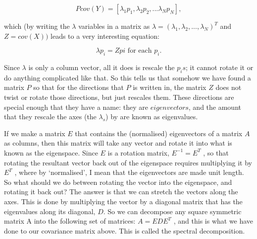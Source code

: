 \documentclass[11pt]{article}
\begin{document}
\begin{equation} 
Pcov(Y) = [\lambda_1 p_1, \lambda_2 p_2,...\lambda_N p_N], 
\end{equation}

which (by writing the \(\lambda\) variables in a matrix as
\(\lambda = (\lambda_1, \lambda_2,...,\lambda_N)^T\) and \(Z = cov(X))\)
leads to a very interesting equation:

\begin{equation} 
\lambda p_i = Zpi \text{ for each } p_i.
\end{equation}

Since \(\lambda\) is only a column vector, all it does is rescale the
\(p_i s\); it cannot rotate it or do anything complicated like that. So
this tells us that somehow we have found a matrix \(P\) so that for the
directions that \(P\) is written in, the matrix \(Z\) does not twist or
rotate those directions, but just rescales them. These directions are
special enough that they have a name: they are \(eigenvectors\), and the
amount that they rescale the axes (the \(\lambda_s\)) by are known as
eigenvalues.

If we make a matrix \(E\) that contains the (normalised) eigenvectors of
a matrix \(A\) as columns, then this matrix will take any vector and
rotate it into what is known as the eigenspace. Since \(E\) is a
rotation matrix, \(E^{-1} = E^T\) , so that rotating the resultant
vector back out of the eigenspace requires multiplying it by \(E^T\) ,
where by `normalised', I mean that the eigenvectors are made unit
length. So what should we do between rotating the vector into the
eigenspace, and rotating it back out? The answer is that we can stretch
the vectors along the axes. This is done by multiplying the vector by a
diagonal matrix that has the eigenvalues along its diagonal, \(D\). So
we can decompose any square symmetric matrix A into the following set of
matrices: \(A = EDE^T\) , and this is what we have done to our
covariance matrix above. This is called the spectral decomposition.
\end{document}
